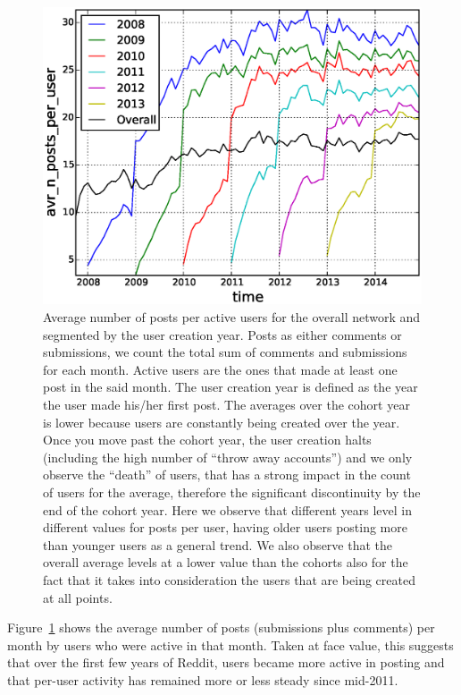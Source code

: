 \begin{figure}[!tb]
\centering
\includegraphics[scale=0.4]{./images/avr_posts_per_user_over_time_cohorts.eps}
\caption{Average number of posts per active users for the overall network and segmented by the user creation year. Posts as either comments or submissions, we count the total sum of comments and submissions for each month. Active users are the ones that made at least one post in the said month. The user creation year is defined as the year the user made his/her first post. The averages over the cohort year is lower because users are constantly being created over the year. Once you move past the cohort year, the user creation halts (including the high number of ``throw away accounts'') and we only observe the ``death'' of users, that has a strong impact in the count of users for the average, therefore the significant discontinuity by the end of the cohort year. Here we observe that different years level in different values for posts per user, having older users posting more than younger users as a general trend. We also observe that the overall average levels at a lower value than the cohorts also for the fact that it takes into consideration the users that are being created at all points.}
\label{fig:avr_posts_per_user_over_time_cohorts}
\end{figure}

Figure~\ref{fig:avr_posts_per_user_over_time_cohorts} shows the average number of posts (submissions plus comments) per month by users who were active in that month.  Taken at face value, this suggests that over the first few years of Reddit, users became more active in posting and that per-user activity has remained more or less steady since mid-2011.


